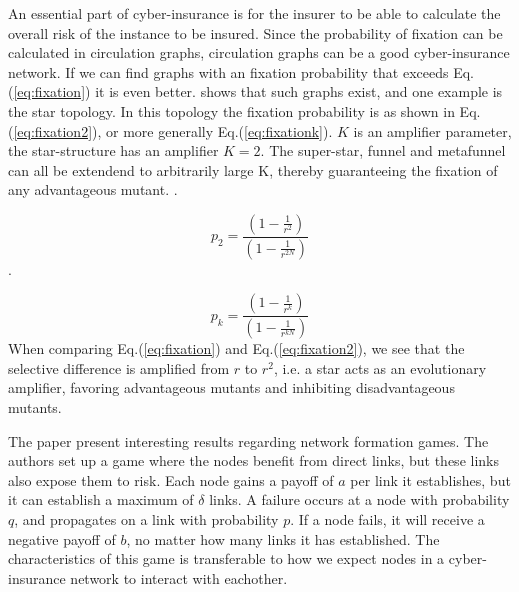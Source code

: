 An essential part of cyber-insurance is for the insurer to be able to calculate the overall risk of the instance to be insured. Since the probability of fixation can be calculated in circulation graphs, circulation graphs can be a good cyber-insurance network. 
If we can find graphs with an fixation probability that exceeds Eq.(\ref{eq:fixation}) it is even better. \cite{lieberman2005evolutionary} shows that such graphs exist, and one example is the star topology.
In this topology the fixation probability is as shown in Eq.(\ref{eq:fixation2}), or more generally Eq.(\ref{eq:fixationk}). $K$ is an amplifier parameter, the star-structure has an amplifier $K=2$. The super-star, funnel and metafunnel can all be extendend to arbitrarily large K, thereby guaranteeing the fixation of any advantageous mutant. \cite{lieberman2005evolutionary}.

\begin{equation}p_{2}=\frac{(1-\frac{1}{r^{2}})}{(1-\frac{1}{r^{2N}})} \label{eq:fixation2} \end{equation}.

\begin{equation}
p_{k}=\frac{(1-\frac{1}{r^{k}})}{(1-\frac{1}{r^{kN}})} \label{eq:fixationk}
\end{equation}
 When comparing Eq.(\ref{eq:fixation}) and Eq.(\ref{eq:fixation2}), we see that the selective difference is
 amplified from $r$ to $r^{2}$, i.e. a star acts as an evolutionary amplifier, favoring advantageous
  mutants and inhibiting disadvantageous mutants.

The paper \cite{contagion} present interesting results regarding network formation games. 
The authors set up a game where the nodes benefit from direct links, but these links also expose them to risk. 
Each node gains a payoff of $a$ per link it establishes, but it can establish a maximum of $\delta$ links.
A failure occurs at a node with probability $q$, and propagates on a link with probability $p$. If a node fails, it will receive a negative payoff of $b$, no matter how many links it has established. The characteristics of this game is transferable to how we expect nodes in a cyber-insurance network to interact with eachother. 


